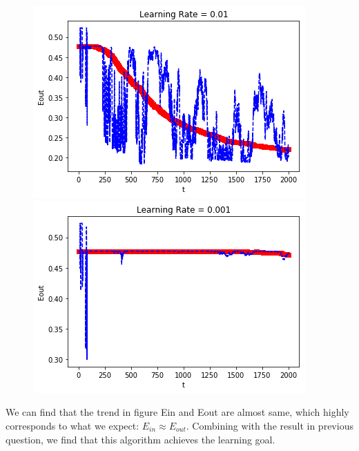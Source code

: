 \documentclass[a4paper,12pt]{article}
\begin{document}
\section{}
\begin{figure}[ht]
\begin{minipage}[b]{0.5\linewidth}
\centering
\includegraphics[scale=0.63]{Q91.png}
\end{minipage}
\hspace{0.5cm}
\begin{minipage}[b]{0.5\linewidth}
\centering
\includegraphics[scale=0.63]{Q92.png}
\end{minipage}
\end{figure}
We can find that the trend in figure Ein and Eout are almost same, which highly corresponds to what we expect: $E_{in} \approx E_{out}$. Combining with the result in previous question, we find that this algorithm achieves the learning goal.
\end{document}

